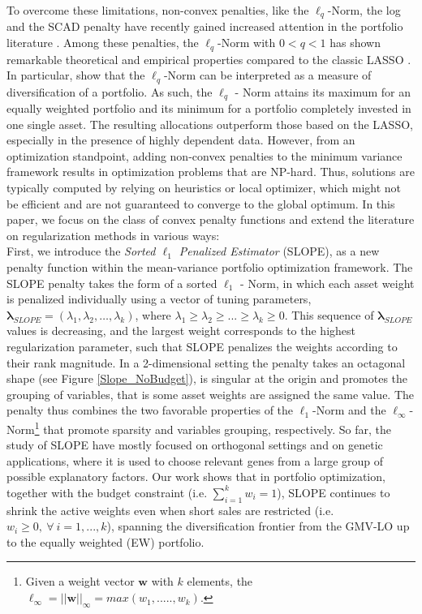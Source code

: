 \documentclass[12pt, a4paper]{article}
\newcommand{\bfw}{\boldsymbol{w} }
\newcommand{\bflambda}{\boldsymbol{\lambda}}
\newcommand{\red}[1]{{\color{red} #1}}
\begin{document}
To overcome these limitations, non-convex penalties, like the $\ell_{q}$-Norm, the log and the SCAD penalty have recently gained increased attention in the portfolio literature \citep{Gasso2010, Fastrich2014, Fastrich2015, Xing2014, Chen2016}.
Among these penalties, the $\ell_{q}$-Norm with $0<q<1$ has shown remarkable theoretical and empirical properties compared to the classic LASSO \citep{Saab2008, Fastrich2014, Chen2016, Giuzio2016a}.\\
In particular, \cite{Fernholtz1998} show that the $\ell_{q}$-Norm can be interpreted as a measure of diversification of a portfolio. As such, the $\ell_{q}$ - Norm attains its maximum for an equally weighted portfolio and its minimum for a portfolio completely invested in one single asset. The resulting allocations outperform those based on the LASSO, especially in the presence of highly dependent data. However, from an optimization standpoint, adding non-convex penalties to the minimum variance framework results in optimization problems that are NP-hard. Thus, solutions are typically computed by relying on heuristics or local optimizer, which might not be efficient and are not guaranteed to converge to the global optimum. %
In this paper, we focus on the class of convex penalty functions and extend the literature on regularization methods in various ways:\\
First, we introduce the \textit{Sorted $\ell_{1}$ Penalized Estimator} (SLOPE), as a new penalty function within the mean-variance portfolio optimization framework. The SLOPE penalty takes the form of a sorted $\ell_{1}$ - Norm, in which each asset weight is penalized individually using a vector of tuning parameters, $\boldsymbol{\lambda}_{SLOPE} = (\lambda_{1},\lambda_{2}, \ldots,\lambda_{k})$, where $\lambda_{1} \geq \lambda_{2} \geq ... \geq \lambda_{k} \geq 0$. This sequence of $\bflambda_{SLOPE}$ values is decreasing, and the largest weight corresponds to the highest regularization parameter, such that SLOPE penalizes the weights according to their rank magnitude.
In a 2-dimensional setting the penalty takes an octagonal shape (see Figure \ref{Slope_NoBudget}), is singular at the origin and promotes the grouping of variables, that is some asset weights are assigned the same value. The penalty thus combines the two favorable properties of the $\ell_{1}$-Norm and the $\ell_{\infty}$-Norm\footnote{Given a weight vector $\bfw$ with $k$ elements, the $\ell_{\infty} = ||\bfw||_{\infty} = max(w_{1}, .....,w_{k})$.} that promote sparsity and variables grouping, respectively. So far, the study of SLOPE have mostly focused on orthogonal settings and on genetic applications, where it is used to choose relevant genes from a large group of possible explanatory factors. Our work shows that in portfolio optimization, together with the budget constraint (i.e. $\sum_{i=1}^{k} w_{i} = 1$), SLOPE continues to shrink the active weights even when short sales are restricted (i.e. $w_{i} \geq 0,\ \forall \ i=1,...,k$), spanning the diversification frontier from the GMV-LO up to the equally weighted (EW) portfolio.\\
\end{document}
